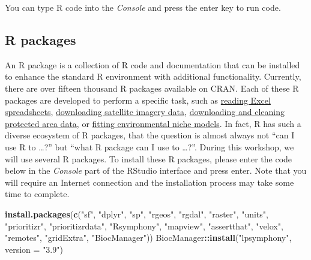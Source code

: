 \documentclass[12pt,]{book}
\newenvironment{Shaded}{\begin{snugshade}}{\end{snugshade}}
\newcommand{\KeywordTok}[1]{\textcolor[rgb]{0.13,0.29,0.53}{\textbf{#1}}}
\newcommand{\DataTypeTok}[1]{\textcolor[rgb]{0.13,0.29,0.53}{#1}}
\newcommand{\StringTok}[1]{\textcolor[rgb]{0.31,0.60,0.02}{#1}}
\newcommand{\OperatorTok}[1]{\textcolor[rgb]{0.81,0.36,0.00}{\textbf{#1}}}
\newcommand{\NormalTok}[1]{#1}
\begin{document}
You can type R code into the \emph{Console} and press the enter key to
run code.

\subsection{R packages}\label{r-packages}

An R package is a collection of R code and documentation that can be
installed to enhance the standard R environment with additional
functionality. Currently, there are over fifteen thousand R packages
available on CRAN. Each of these R packages are developed to perform a
specific task, such as
\href{https://cran.r-project.org/web/packages/readxl/index.html}{reading
Excel spreadsheets},
\href{https://cran.r-project.org/web/packages/MODIStsp/index.html}{downloading
satellite imagery data},
\href{https://cran.r-project.org/web/packages/wdpar/index.html}{downloading
and cleaning protected area data}, or
\href{https://cran.r-project.org/web/packages/ENMeval/index.html}{fitting
environmental niche models}. In fact, R has such a diverse ecosystem of
R packages, that the question is almost always not ``can I use R to
\ldots{}?'' but ``what R package can I use to \ldots{}?''. During this
workshop, we will use several R packages. To install these R packages,
please enter the code below in the \emph{Console} part of the RStudio
interface and press enter. Note that you will require an Internet
connection and the installation process may take some time to complete.

\begin{Shaded}
\begin{Highlighting}[]
\KeywordTok{install.packages}\NormalTok{(}\KeywordTok{c}\NormalTok{(}\StringTok{"sf"}\NormalTok{, }\StringTok{"dplyr"}\NormalTok{, }\StringTok{"sp"}\NormalTok{, }\StringTok{"rgeos"}\NormalTok{, }\StringTok{"rgdal"}\NormalTok{, }\StringTok{"raster"}\NormalTok{,}
                   \StringTok{"units"}\NormalTok{, }\StringTok{"prioritizr"}\NormalTok{, }\StringTok{"prioritizrdata"}\NormalTok{, }\StringTok{"Rsymphony"}\NormalTok{,}
                   \StringTok{"mapview"}\NormalTok{, }\StringTok{"assertthat"}\NormalTok{, }\StringTok{"velox"}\NormalTok{, }\StringTok{"remotes"}\NormalTok{,}
                   \StringTok{"gridExtra"}\NormalTok{, }\StringTok{"BiocManager"}\NormalTok{))}
\NormalTok{BiocManager}\OperatorTok{::}\KeywordTok{install}\NormalTok{(}\StringTok{"lpsymphony"}\NormalTok{, }\DataTypeTok{version =} \StringTok{"3.9"}\NormalTok{)}
\end{Highlighting}
\end{Shaded}
\end{document}
